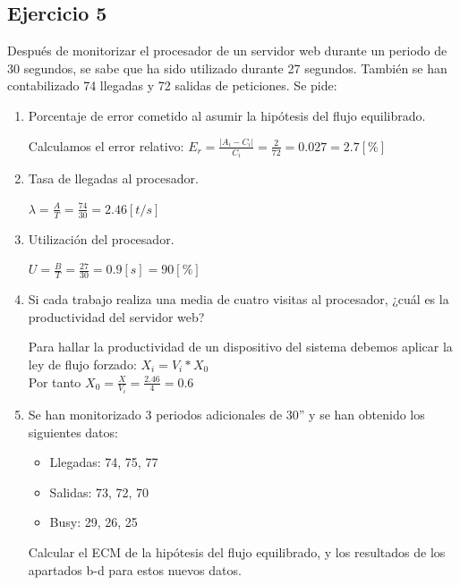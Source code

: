 \subsection{Ejercicio 5}
Después de monitorizar el procesador de un servidor web durante un periodo de 30 segundos, se sabe que ha sido utilizado durante 27 segundos. También se han contabilizado 74 llegadas y 72 salidas de peticiones. Se pide:
\begin{enumerate}
    \item Porcentaje de error cometido al asumir la hipótesis del flujo equilibrado.
    \begin{tcolorbox}[colback=white,colframe=cyan!50!black,fonttitle=\bfseries]
    Calculamos el error relativo: $E_r=\frac{|A_i - C_i|}{C_i}=\frac{2}{72}=0.027=2.7[\%]$\\
    \end{tcolorbox}
    \item Tasa de llegadas al procesador.
    \begin{tcolorbox}[colback=white,colframe=cyan!50!black,fonttitle=\bfseries]
    $\lambda = \frac{A}{T} = \frac{74}{30} = 2.46 [t/s]$
    \end{tcolorbox}
    \item Utilización del procesador.
    \begin{tcolorbox}[colback=white,colframe=cyan!50!black,fonttitle=\bfseries]
    $U = \frac{B}{T} = \frac{27}{30} = 0.9[s] = 90[\%]$
    \end{tcolorbox}
    \item Si cada trabajo realiza una media de cuatro visitas al procesador, ¿cuál es la productividad del servidor web?
    \begin{tcolorbox}[colback=white,colframe=cyan!50!black,fonttitle=\bfseries]
    Para hallar la productividad de un dispositivo del sistema debemos aplicar la ley de flujo forzado:
    $X_i = V_i * X_0$\\ Por tanto $X_0 = \frac{X}{V_i} = \frac{2.46}{4} = 0.6$
    \end{tcolorbox}
    \item Se han monitorizado 3 periodos adicionales de 30” y se han obtenido los siguientes datos:
    \begin{itemize}
        \item Llegadas: 74, 75, 77
        \item Salidas: 73, 72, 70
        \item Busy: 29, 26, 25
    \end{itemize}
    Calcular el ECM de la hipótesis del flujo equilibrado, y los resultados de los apartados b-d para estos nuevos datos.

\end{enumerate}
